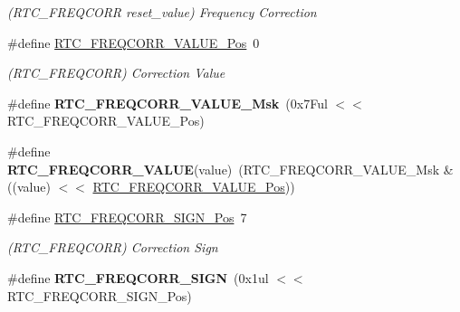 \begin{DoxyCompactItemize}
\begin{DoxyCompactList}\small\item\em (R\+T\+C\+\_\+\+F\+R\+E\+Q\+C\+O\+R\+R reset\+\_\+value) Frequency Correction \end{DoxyCompactList}\item 
\hypertarget{group___s_a_m_l21___r_t_c_ga1a30c52fa03ef3638300859f277401f0}{}\#define \hyperlink{group___s_a_m_l21___r_t_c_ga1a30c52fa03ef3638300859f277401f0}{R\+T\+C\+\_\+\+F\+R\+E\+Q\+C\+O\+R\+R\+\_\+\+V\+A\+L\+U\+E\+\_\+\+Pos}~0\label{group___s_a_m_l21___r_t_c_ga1a30c52fa03ef3638300859f277401f0}

\begin{DoxyCompactList}\small\item\em (R\+T\+C\+\_\+\+F\+R\+E\+Q\+C\+O\+R\+R) Correction Value \end{DoxyCompactList}\item 
\hypertarget{group___s_a_m_l21___r_t_c_ga9cab92e1c28f509c9112ba612db8bdb1}{}\#define {\bfseries R\+T\+C\+\_\+\+F\+R\+E\+Q\+C\+O\+R\+R\+\_\+\+V\+A\+L\+U\+E\+\_\+\+Msk}~(0x7\+Ful $<$$<$ R\+T\+C\+\_\+\+F\+R\+E\+Q\+C\+O\+R\+R\+\_\+\+V\+A\+L\+U\+E\+\_\+\+Pos)\label{group___s_a_m_l21___r_t_c_ga9cab92e1c28f509c9112ba612db8bdb1}

\item 
\hypertarget{group___s_a_m_l21___r_t_c_ga810ea0bbbbe7c9e2be4190654aaed4d1}{}\#define {\bfseries R\+T\+C\+\_\+\+F\+R\+E\+Q\+C\+O\+R\+R\+\_\+\+V\+A\+L\+U\+E}(value)~(R\+T\+C\+\_\+\+F\+R\+E\+Q\+C\+O\+R\+R\+\_\+\+V\+A\+L\+U\+E\+\_\+\+Msk \& ((value) $<$$<$ \hyperlink{group___s_a_m_l21___r_t_c_ga1a30c52fa03ef3638300859f277401f0}{R\+T\+C\+\_\+\+F\+R\+E\+Q\+C\+O\+R\+R\+\_\+\+V\+A\+L\+U\+E\+\_\+\+Pos}))\label{group___s_a_m_l21___r_t_c_ga810ea0bbbbe7c9e2be4190654aaed4d1}

\item 
\hypertarget{group___s_a_m_l21___r_t_c_ga1ff71647496cb2872a1b7cc108eadff6}{}\#define \hyperlink{group___s_a_m_l21___r_t_c_ga1ff71647496cb2872a1b7cc108eadff6}{R\+T\+C\+\_\+\+F\+R\+E\+Q\+C\+O\+R\+R\+\_\+\+S\+I\+G\+N\+\_\+\+Pos}~7\label{group___s_a_m_l21___r_t_c_ga1ff71647496cb2872a1b7cc108eadff6}

\begin{DoxyCompactList}\small\item\em (R\+T\+C\+\_\+\+F\+R\+E\+Q\+C\+O\+R\+R) Correction Sign \end{DoxyCompactList}\item 
\hypertarget{group___s_a_m_l21___r_t_c_ga3e8e0257dc6a63f34bfa19b3db3b2595}{}\#define {\bfseries R\+T\+C\+\_\+\+F\+R\+E\+Q\+C\+O\+R\+R\+\_\+\+S\+I\+G\+N}~(0x1ul $<$$<$ R\+T\+C\+\_\+\+F\+R\+E\+Q\+C\+O\+R\+R\+\_\+\+S\+I\+G\+N\+\_\+\+Pos)\label{group___s_a_m_l21___r_t_c_ga3e8e0257dc6a63f34bfa19b3db3b2595}


\end{DoxyCompactItemize}
